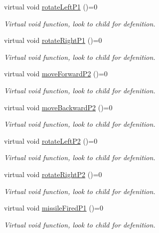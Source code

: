 \begin{DoxyCompactItemize}
virtual void \hyperlink{classActionData_acca33ba2c7ea6df807d7e7b787733178}{rotate\-Left\-P1} ()=0
\begin{DoxyCompactList}\small\item\em Virtual void function, look to child for defenition. \end{DoxyCompactList}\item 
virtual void \hyperlink{classActionData_af780bdc2145493cb28b7f9dbee238328}{rotate\-Right\-P1} ()=0
\begin{DoxyCompactList}\small\item\em Virtual void function, look to child for defenition. \end{DoxyCompactList}\item 
virtual void \hyperlink{classActionData_a30c547419564c80e3764b620bb1833cc}{move\-Forward\-P2} ()=0
\begin{DoxyCompactList}\small\item\em Virtual void function, look to child for defenition. \end{DoxyCompactList}\item 
virtual void \hyperlink{classActionData_a9914514aed490cdf131f4a4be4d0f411}{move\-Backward\-P2} ()=0
\begin{DoxyCompactList}\small\item\em Virtual void function, look to child for defenition. \end{DoxyCompactList}\item 
virtual void \hyperlink{classActionData_aa67078569c7aa6f0f39449c2e9d20abf}{rotate\-Left\-P2} ()=0
\begin{DoxyCompactList}\small\item\em Virtual void function, look to child for defenition. \end{DoxyCompactList}\item 
virtual void \hyperlink{classActionData_aae9de974e0b844d04eec06087d867246}{rotate\-Right\-P2} ()=0
\begin{DoxyCompactList}\small\item\em Virtual void function, look to child for defenition. \end{DoxyCompactList}\item 
virtual void \hyperlink{classActionData_aeb7f1219ff0bf0cc81fee1d669317cdb}{missile\-Fired\-P1} ()=0
\begin{DoxyCompactList}\small\item\em Virtual void function, look to child for defenition. \end{DoxyCompactList}\item 

\end{DoxyCompactItemize}
